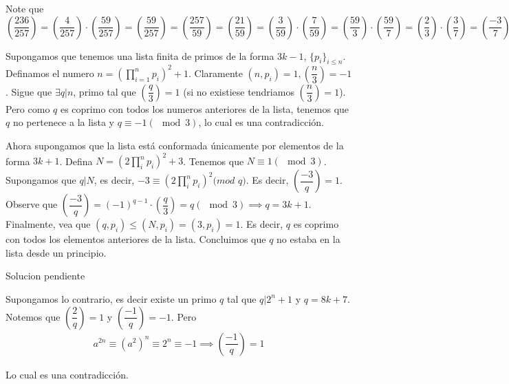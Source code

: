 \begin{sol}
	Note que $\left(\dfrac{236}{257}\right)  = \left(\dfrac{4}{257}\right) \cdot  \left(\dfrac{59}{257}\right) = \left(\dfrac{59}{257}\right) = \left(\dfrac{257}{59}\right) = \left(\dfrac{21}{59}\right) = \left(\dfrac{3}{59}\right) \cdot \left(\dfrac{7}{59}\right) = \left(\dfrac{59}{3}\right) \cdot \left(\dfrac{59}{7}\right) = \left(\dfrac{2}{3}\right) \cdot \left(\dfrac{3}{7}\right) = \left(\dfrac{-3}{7}\right) = \left(\dfrac{4}{7}\right) = 1$
\end{sol}

\begin{sol}
	Supongamos que tenemos una lista finita de primos de la forma $3k-1$, $\{p_{i}\}_{i\leq n}$. Definamos el numero $n = \left( \prod_{i=1}^{n} p_{i} \right)^{2} + 1$. Claramente $(n, p_{i}) = 1, \left(\dfrac{n}{3}\right) = -1$. Sigue que $\exists q | n$, primo tal que $ \left(\dfrac{q}{3}\right) = 1$ (si no existiese tendriamos $\left(\dfrac{n}{3}\right) = 1$). Pero como $q$ es coprimo con todos los numeros anteriores de la lista, tenemos que $q$ no pertenece a la lista y $q \equiv -1 (\mod 3)$, lo cual es una contradicci\'on.
	
	Ahora supongamos que la lista est\'a conformada \'unicamente por elementos de la forma $3k+1$. Defina $N = (2 \prod_{i}^{n} p_{i})^{2} + 3$. Tenemos que $N \equiv 1 (\mod 3)$. Supongamos que $q|N$, es decir, $-3 \equiv (2 \prod_{i}^{n} p_{i})^{2} (mod$ $q)$. Es decir, $\left(\dfrac{-3}{q}\right) = 1$. Observe que $\left(\dfrac{-3}{q}\right) = (-1)^{q-1} \cdot \left(\dfrac{q}{3}\right) = q (\mod 3) \implies q = 3k+1$. Finalmente, vea que $(q, p_{i}) \leq (N, p_{i}) = (3,p_{i}) = 1$. Es decir, $q$ es coprimo con todos los elementos anteriores de la lista. Concluimos que $q$ no estaba en la lista desde un principio.
\end{sol}

\begin{sol}
	Solucion pendiente
\end{sol}

\begin{sol}
	Supongamos lo contrario, es decir existe un primo $q$ tal que $q | 2^{n}+1$ y $q = 8k +7$. Notemos que $\left(\dfrac{2}{q}\right) = 1$ y $\left(\dfrac{-1}{q}\right) =-1$. Pero 
	\begin{align}
	a^{2n} \equiv \left(a^{2}\right)^{n} \equiv 2^{n} \equiv -1 \implies \left(\dfrac{-1}{q}\right) = 1
	\end{align}
	
	Lo cual es una contradicci\'on. 
\end{sol}

